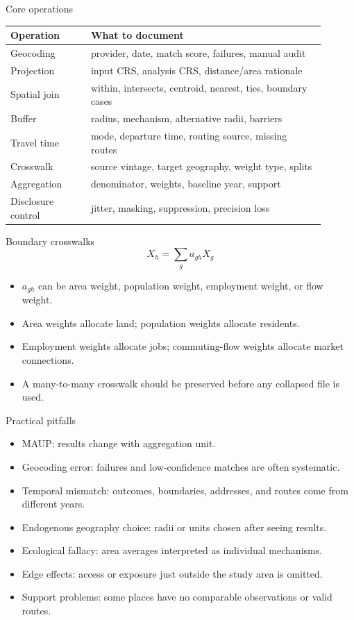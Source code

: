 \documentclass[aspectratio=169,11pt]{beamer}
\newcommand{\1}{\mathbf{1}}
\begin{document}
\begin{frame}{Core operations}
\small
\begin{tabular}{p{0.23\linewidth} p{0.67\linewidth}}
\toprule
Operation & What to document \\
\midrule
Geocoding & provider, date, match score, failures, manual audit \\
Projection & input CRS, analysis CRS, distance/area rationale \\
Spatial join & within, intersects, centroid, nearest, ties, boundary cases \\
Buffer & radius, mechanism, alternative radii, barriers \\
Travel time & mode, departure time, routing source, missing routes \\
Crosswalk & source vintage, target geography, weight type, splits \\
Aggregation & denominator, weights, baseline year, support \\
Disclosure control & jitter, masking, suppression, precision loss \\
\bottomrule
\end{tabular}
\end{frame}

\begin{frame}{Boundary crosswalks}
\small
\[
X_h=\sum_g a_{gh}X_g
\]

\begin{itemize}
    \item \(a_{gh}\) can be area weight, population weight, employment weight, or flow weight.
    \item Area weights allocate land; population weights allocate residents.
    \item Employment weights allocate jobs; commuting-flow weights allocate market connections.
    \item A many-to-many crosswalk should be preserved before any collapsed file is used.
\end{itemize}
\end{frame}

\begin{frame}{Practical pitfalls}
\begin{itemize}
    \item MAUP: results change with aggregation unit.
    \item Geocoding error: failures and low-confidence matches are often systematic.
    \item Temporal mismatch: outcomes, boundaries, addresses, and routes come from different years.
    \item Endogenous geography choice: radii or units chosen after seeing results.
    \item Ecological fallacy: area averages interpreted as individual mechanisms.
    \item Edge effects: access or exposure just outside the study area is omitted.
    \item Support problems: some places have no comparable observations or valid routes.
\end{itemize}
\end{frame}
\end{document}
